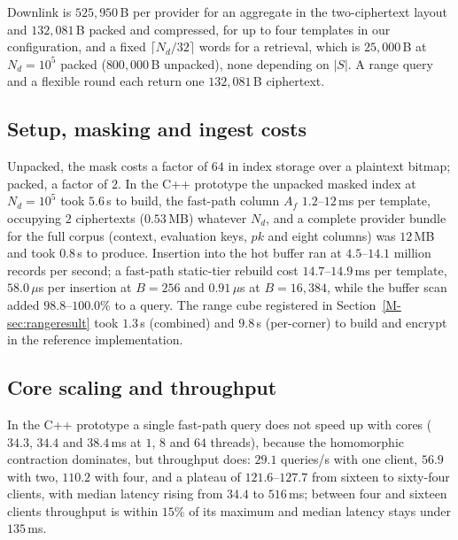 \documentclass[11pt,a4paper]{article}
\newcommand{\mref}[1]{\ref{M-#1}}
\newcommand{\authorcheck}[1]{}
\begin{document}
Downlink is $525{,}950$\,B per provider for an aggregate in the two-ciphertext
layout and $132{,}081$\,B packed and compressed, for up to four templates in
our configuration, and a fixed $\lceil N_d/32\rceil$ words for a retrieval,
which is $25{,}000$\,B at $N_d=10^5$ packed ($800{,}000$\,B unpacked), none
depending on $|S|$. A range query and a flexible round each return one
$132{,}081$\,B ciphertext.

\subsection{Setup, masking and ingest costs}
\label{sec:setupresult}
Unpacked, the mask costs a factor of $64$ in index storage over a plaintext
bitmap; packed, a factor of $2$. In the C++ prototype the unpacked masked index
at $N_d=10^5$ took $5.6$\,s to build, the fast-path column $A_f$ $1.2$--$12$\,ms
per template, occupying $2$ ciphertexts ($0.53$\,MB) whatever $N_d$, and a
complete provider bundle for the full corpus (context, evaluation keys, $pk$
and eight columns) was $12$\,MB and took $0.8$\,s to produce. Insertion into the hot
buffer ran at $4.5$--$14.1$ million records per second; a fast-path static-tier
rebuild cost $14.7$--$14.9$\,ms per template, $58.0\,\mu$s per insertion at
$B=256$ and $0.91\,\mu$s at $B=16{,}384$, while the buffer scan added
$98.8$--$100.0\%$ to a query. The range cube registered in
Section~\mref{sec:rangeresult} took $1.3$\,s (combined) and $9.8$\,s
(per-corner) to build and encrypt in the reference implementation.
\authorcheck{Re-measure the masked-index build with rejection sampling and
packing in C++.}


\subsection{Core scaling and throughput}
\label{sec:scaling}
In the C++ prototype a single fast-path query does not speed up with cores
($34.3$, $34.4$ and $38.4$\,ms at $1$, $8$ and $64$ threads), because the
homomorphic contraction dominates, but throughput does: $29.1$ queries/s with
one client, $56.9$ with two, $110.2$ with four, and a plateau of
$121.6$--$127.7$ from sixteen to sixty-four clients, with median latency rising
from $34.4$ to $516$\,ms; between four and sixteen clients throughput is within
$15\%$ of its maximum and median latency stays under $135$\,ms.
\end{document}
